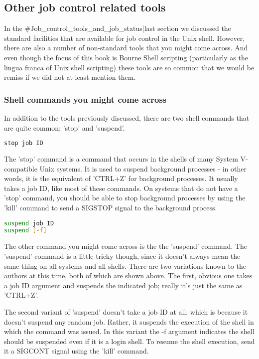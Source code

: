 \subsection{Other job control related tools}
In the \#Job\_control\_tools\_and\_job\_status|last section we discussed the
standard facilities that are available for job control in the Unix shell.
However, there are also a number of non-standard tools that you might come
across. And even though the focus of this book is Bourne Shell scripting
(particularly as the lingua franca of Unix shell scripting) these tools are so
common that we would be remiss if we did not at least mention them.

\subsubsection{Shell commands you might come across}
In addition to the tools previously discussed, there are two shell commands
that are quite common: 'stop' and 'suspend'.

\lstset{basicstyle=\scriptsize, numbers=left, captionpos=b, tabsize=4}
\begin{lstlisting}[language={bash},xleftmargin=15pt]
stop job ID
\end{lstlisting}

The 'stop' command is a command that occurs in the shells of many System
V-compatible Unix systems. It is used to suspend background processes - in
other words, it is the equivalent of 'CTRL+Z' for background processes. It
usually takes a job ID, like most of these commands. On systems that do not
have a 'stop' command, you should be able to stop background processes by using
the 'kill' command to send a SIGSTOP signal to the background process.

\lstset{basicstyle=\scriptsize, numbers=left, captionpos=b, tabsize=4}
\begin{lstlisting}[language={bash},
xleftmargin=15pt]
suspend job ID 
suspend [-f]
\end{lstlisting}

The other command you might come across is the the 'suspend' command. The
'suspend' command is a little tricky though, since it doesn't always mean the
same thing on all systems and all shells. There are two variations known to the
authors at this time, both of which are shown above. The first, obvious one
takes a job ID argument and suspends the indicated job; really it's just the
same as 'CTRL+Z'. 

The second variant of 'suspend' doesn't take a job ID at all, which is because
it doesn't suspend any random job. Rather, it suspends the execution of the
shell in which the command was issued. In this variant the -f argument
indicates the shell should be suspended even if it is a login shell. To resume
the shell execution, send it a SIGCONT signal using the 'kill' command.

